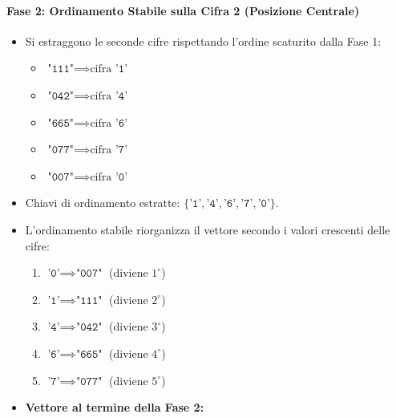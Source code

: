 \paragraph{Fase 2: Ordinamento Stabile sulla Cifra 2 (Posizione Centrale)}
\begin{itemize}
  \item Si estraggono le seconde cifre rispettando l'ordine scaturito dalla Fase 1:
  \begin{itemize}
    \item $\texttt{"111"} \implies \text{cifra } \texttt{'1'}$
    \item $\texttt{"042"} \implies \text{cifra } \texttt{'4'}$
    \item $\texttt{"665"} \implies \text{cifra } \texttt{'6'}$
    \item $\texttt{"077"} \implies \text{cifra } \texttt{'7'}$
    \item $\texttt{"007"} \implies \text{cifra } \texttt{'0'}$
  \end{itemize}
  \item Chiavi di ordinamento estratte: $\{\texttt{'1'}, \texttt{'4'}, \texttt{'6'}, \texttt{'7'}, \texttt{'0'}\}$.
  \item L'ordinamento stabile riorganizza il vettore secondo i valori crescenti delle cifre:
  \begin{enumerate}
    \item $\texttt{'0'} \implies \texttt{"007"}$ (diviene $1^\circ$)
    \item $\texttt{'1'} \implies \texttt{"111"}$ (diviene $2^\circ$)
    \item $\texttt{'4'} \implies \texttt{"042"}$ (diviene $3^\circ$)
    \item $\texttt{'6'} \implies \texttt{"665"}$ (diviene $4^\circ$)
    \item $\texttt{'7'} \implies \texttt{"077"}$ (diviene $5^\circ$)
  \end{enumerate}
  \item \textbf{Vettore al termine della Fase 2:}
  \begin{equation}
    [\texttt{"007"}, \; \texttt{"111"}, \; \texttt{"042"}, \; \texttt{"665"}, \; \texttt{"077"}]
  \end{equation}
\end{itemize}

